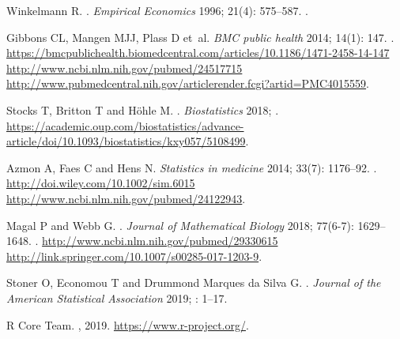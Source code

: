 \documentclass{article}
\begin{document}
\begin{thebibliography}{10}
  Winkelmann R.
  .
  \newblock \emph{Empirical Economics} 1996; 21(4): 575--587.
  \newblock {}.
  
  Gibbons CL, Mangen MJJ, Plass D et~al.
  \newblock \emph{BMC public health} 2014; 14(1): 147.
  \newblock {}.
  \newblock
    \urlprefix\url{https://bmcpublichealth.biomedcentral.com/articles/10.1186/1471-2458-14-147
    http://www.ncbi.nlm.nih.gov/pubmed/24517715
    http://www.pubmedcentral.nih.gov/articlerender.fcgi?artid=PMC4015559}.
  
  Stocks T, Britton T and H{\"{o}}hle M.
  .
  \newblock \emph{Biostatistics} 2018; .
  \newblock
    \urlprefix\url{https://academic.oup.com/biostatistics/advance-article/doi/10.1093/biostatistics/kxy057/5108499}.
  
  Azmon A, Faes C and Hens N.
  \newblock \emph{Statistics in medicine} 2014; 33(7): 1176--92.
  \newblock {}.
  \newblock \urlprefix\url{http://doi.wiley.com/10.1002/sim.6015
    http://www.ncbi.nlm.nih.gov/pubmed/24122943}.
  
  Magal P and Webb G.
  .
  \newblock \emph{Journal of Mathematical Biology} 2018; 77(6-7): 1629--1648.
  \newblock {}.
  \newblock \urlprefix\url{http://www.ncbi.nlm.nih.gov/pubmed/29330615
    http://link.springer.com/10.1007/s00285-017-1203-9}.
  
  Stoner O, Economou T and {Drummond Marques da Silva} G.
  .
  \newblock \emph{Journal of the American Statistical Association} 2019; :
    1--17.
  
  {R Core Team}.
  , 2019.
  \newblock \urlprefix\url{https://www.r-project.org/}.
  

\end{thebibliography}
\end{document}
